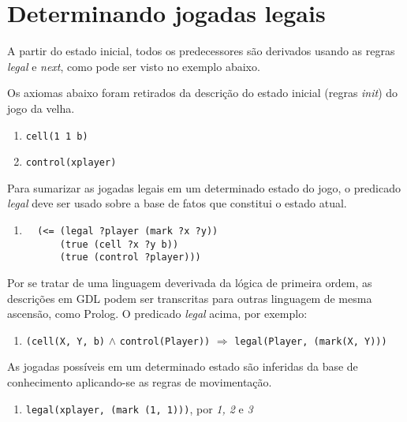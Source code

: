 \section{Determinando jogadas legais}
A partir do estado inicial, todos os predecessores são derivados usando as regras \textit{legal} e \textit{next}, como pode ser visto no exemplo abaixo.

Os axiomas abaixo foram retirados da descrição do estado inicial (regras \textit{init}) do jogo da velha.
\begin{enumerate}
  \singlespacing
  \item \verb|cell(1 1 b)|
  \item \verb|control(xplayer)|
\end{enumerate}
 \doublespacing

Para sumarizar as jogadas legais em um determinado estado do jogo, o predicado \textit{legal} deve ser usado sobre a base de fatos que constitui o estado atual.

\begin{enumerate}
	\singlespacing
  	\setcounter{enumi}{2}
  	\item 
  		\begin{verbatim}
  (<= (legal ?player (mark ?x ?y))                                                                       
      (true (cell ?x ?y b))                                                                              
      (true (control ?player)))               
 		\end{verbatim}
\end{enumerate}
 \doublespacing

Por se tratar de uma linguagem deverivada da lógica de primeira ordem, as descrições em GDL podem ser transcritas para outras linguagem de mesma ascensão, como Prolog. O predicado \textit{legal} acima, por exemplo:

\begin{enumerate}
 	\singlespacing
  	\setcounter{enumi}{2}
  	\item 
  		\verb|(cell(X, Y, b)| $\land$ \verb|control(Player))| $\Rightarrow$ \verb|legal(Player, (mark(X, Y)))|
\end{enumerate}
 \doublespacing

As jogadas possíveis em um determinado estado são inferidas da base de conhecimento aplicando-se as regras de movimentação.
\begin{enumerate}
  	\singlespacing
  	\setcounter{enumi}{3}
  	\item 
  		\verb|legal(xplayer, (mark (1, 1)))|, por {\it 1, 2} e {\it 3}
\end{enumerate}
\doublespacing

